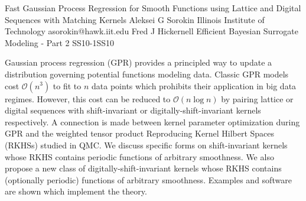 \begin{talk}
  {Fast Gaussian Process Regression for Smooth Functions using Lattice and Digital Sequences with Matching Kernels}%
  {Aleksei G Sorokin}%
  {Illinois Institute of Technology}%
  {asorokin@hawk.iit.edu}%
  {Fred J Hickernell}%
{Efficient Bayesian Surrogate Modeling - Part 2}
{}{SS10-1}{SS10}


				
				

Gaussian process regression (GPR) provides a principled way to update a distribution governing potential functions modeling data. Classic GPR  models cost $\mathcal{O}(n^3)$ to fit to $n$ data points which prohibits their application in big data regimes. However, this cost can be reduced to $\mathcal{O}(n \log n)$ by pairing lattice or digital sequences with shift-invariant or digitally-shift-invariant kernels respectively. A connection is made between kernel parameter optimization during GPR and the weighted tensor product Reproducing Kernel Hilbert Spaces (RKHSs) studied in QMC. We discuss specific forms on shift-invariant kernels whose RKHS contains periodic functions of arbitrary smoothness. We also propose a new class of digitally-shift-invariant kernels whose RKHS contains (optionally periodic) functions of arbitrary smoothness. Examples and software are shown which implement the theory.
\end{talk}

